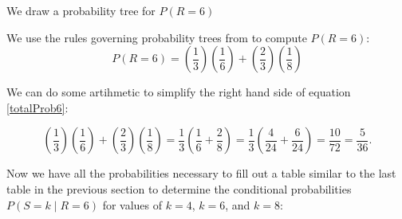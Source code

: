 \documentclass[a4paper,11pt]{article}
\begin{document}
We draw a probability tree for $P \left( R=6 \right)$

\begin{center}
\end{center}

We use the rules governing probability trees from \cite{reading3} to
compute $P \left( R=6 \right)$:
\begin{equation} \label{totalProb6}
  P \left( R=6 \right) = 
    \left( \frac{1}{3} \right) \left( \frac{1}{6} \right)
  + \left(  \frac{2}{3} \right) \left( \frac{1}{8} \right)
\end{equation}

We can do some artihmetic to simplify the right hand side of equation
\ref{totalProb6}:

\begin{equation} \label{totalProb6}
    \left( \frac{1}{3} \right) \left( \frac{1}{6} \right)
  + \left(  \frac{2}{3} \right) \left( \frac{1}{8} \right)
  = \frac{1}{3} \left( \frac{1}{6} + \frac{2}{8} \right)
  = \frac{1}{3} \left( \frac{4}{24} + \frac{6}{24} \right)
  = \frac{10}{72} = \frac{5}{36}.
\end{equation}

Now we have all the probabilities necessary to fill out a table similar
to the last table in the previous section to determine the conditional 
probabilities $P \left( S=k \mid R=6 \right)$ for values of $k=4$, 
$k=6$, and $k=8$:
\end{document}

